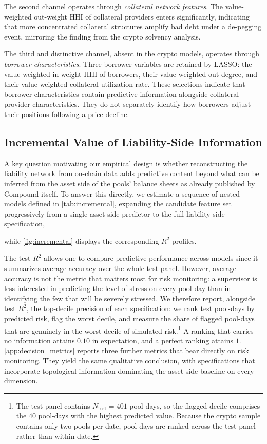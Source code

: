 \documentclass[a4paper,UKenglish,cleveref, autoref, thm-restate]{informs3}
\newcommand{\rev}[1]{{\color{purple}#1}}
\DeclareRobustCommand{\latestrev}[1]{{\color{red}\hypersetup{linkcolor=red,citecolor=red,urlcolor=red}#1}}
\begin{document}
The second channel operates through \emph{collateral network features}. The value-weighted out-weight HHI of collateral providers enters significantly, indicating that more concentrated collateral structures amplify bad debt under a de-pegging event, mirroring the finding from the crypto solvency analysis.

The third and distinctive channel, absent in the crypto models, operates through \emph{borrower characteristics}. Three borrower variables are retained by LASSO: the
value-weighted in-weight HHI of borrowers, their value-weighted out-degree, and their value-weighted collateral utilization rate. \latestrev{These selections indicate that borrower characteristics contain predictive information alongside collateral-provider characteristics. They do not separately identify how borrowers adjust their positions following a price decline.}

\subsection{Incremental Value of Liability-Side Information}
\label{sec:results_incremental}

A key question motivating our empirical design is whether 
reconstructing the liability network from on-chain data adds 
predictive content beyond what can be inferred from the asset 
side of the pools' balance sheets as already published by 
Compound itself. To answer this directly, we estimate a sequence 
of nested models defined in \autoref{tab:incremental}, expanding 
the candidate feature set progressively from a single asset-side 
predictor to the full liability-side specification, \rev{ while \autoref{fig:incremental} displays the corresponding $R^2$ 
profiles. 

The test $R^2$ allows one to compare predictive performance
across models since it summarizes average accuracy over the whole
test panel. However, average accuracy is not the metric that
matters most for risk monitoring: a supervisor is less interested
in predicting the level of stress on every pool-day than in
identifying the few that will be severely stressed. We therefore
report, alongside test $R^2$, the top-decile precision of each
specification: we rank test pool-days by predicted risk, flag the
worst decile, and measure the share of flagged pool-days that are
genuinely in the worst decile of \latestrev{simulated} risk.\footnote{The test
panel contains $N_{\text{test}} = 401$ pool-days, so the flagged
decile comprises the $40$ pool-days with the highest predicted
value. Because the crypto sample contains only two pools per date,
pool-days are ranked across the test panel rather than within
date.} A ranking that carries no information attains $0.10$ in
expectation, and a perfect ranking attains $1$.
\ref{app:decision_metrics} reports three further metrics that bear
directly on risk monitoring. They yield the same
qualitative conclusion, with specifications that incorporate
topological information dominating the asset-side baseline on
every dimension.}
\end{document}
